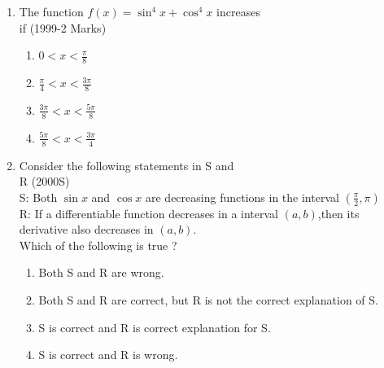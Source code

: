 \documentclass[journal,12pt,twocolumn]{IEEEtran}
\theoremstyle{remark}
\begin{document}
\begin{enumerate}[start=9]
\item The function $f(x)= \sin^4x+\cos^4x$ increases \\
if \hfill (1999-2 Marks)
\begin{enumerate}
    \item $0<x<\displaystyle\frac{\pi}{8}$\\
    \item $\displaystyle\frac{\pi}{4}<x<\displaystyle\frac{3\pi}{8}$\\
    \item $\displaystyle\frac{3\pi}{8} <x<\displaystyle\frac{5\pi}{8}$\\
    \item $\displaystyle\frac{5\pi}{8}<x<\displaystyle\frac{3\pi}{4}$\\
\end{enumerate}
\item Consider the following statements in S and \\
R \hfill {(2000S)}\\
S: Both $\sin x$ and $\cos x$ are decreasing functions in the interval $\left(\displaystyle\frac{\pi}{2},\pi\right)$\\
R: If a differentiable function decreases in a interval $(a,b)$,then its derivative also decreases in $(a,b)$.\\
Which of the following is true ?
\begin{enumerate}
    \item Both S and R are wrong.
    \item Both S and R are correct, but R is not the correct explanation of S.
    \item S is correct and R is correct explanation for S.
    \item S is correct and R is wrong.\\
\end{enumerate}


\end{enumerate}
\end{document}
